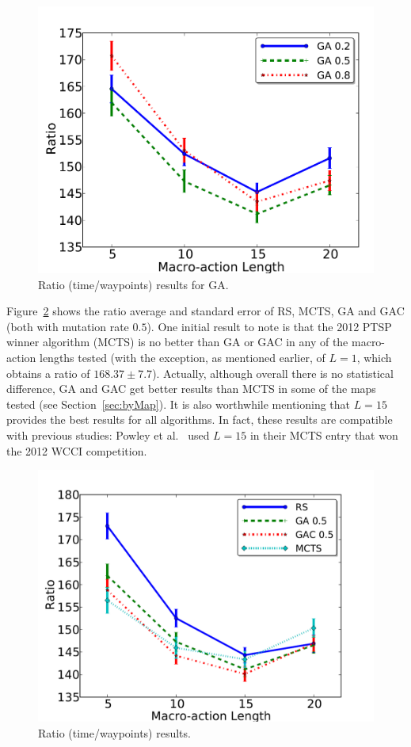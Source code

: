 \documentclass{sig-alternate}
\begin{document}
\begin{figure} [!b]
	\begin{center}
	\includegraphics[width=0.75\columnwidth,natwidth=970,natheight=771]{img/GAmut40ms.png}
	\caption{Ratio (time/waypoints) results for GA.}
	\label{fig:ratDetGA}
	\end{center}
\end{figure}

Figure~\ref{fig:ratDetAll} shows the ratio average and standard error of RS, MCTS, GA and GAC (both with mutation rate $0.5$). One initial result to note is that the 2012 PTSP winner algorithm (MCTS) is no better than GA or GAC in any of the macro-action lengths tested (with the exception, as mentioned earlier, of $L=1$, which obtains a ratio of $168.37 \pm 7.7$). Actually, although overall there is no statistical difference, GA and GAC get better results than MCTS in some of the maps tested (see Section~\ref{sec:byMap}). It is also worthwhile mentioning that $L=15$ provides the best results for all algorithms. In fact, these results are compatible with previous studies: Powley et al.~\cite{Powley2012} used $L=15$ in their MCTS entry that won the 2012 WCCI competition. 

\begin{figure} [!b]
	\begin{center}
	\includegraphics[width=0.75\columnwidth,natwidth=1025,natheight=769]{img/Allmut40ms.png}
	\caption{Ratio (time/waypoints) results.}
	\label{fig:ratDetAll}
	\end{center}
\end{figure}
\end{document}
